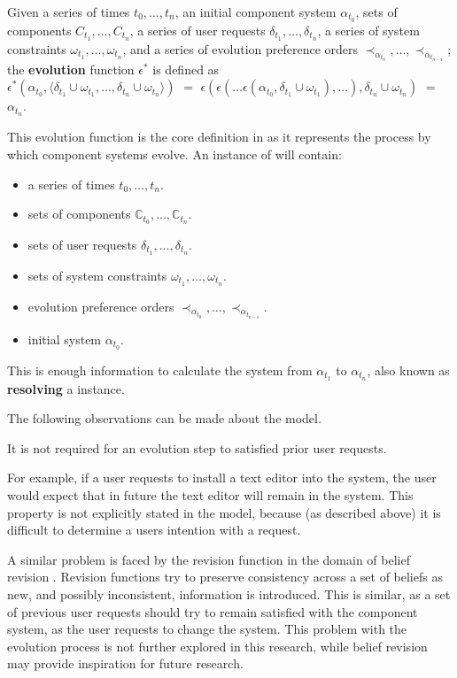 \begin{defs}
Given a series of times $t_0,\ldots,t_n$, an initial component system $\alpha_{t_0}$, 
sets of components $C_{t_1},\ldots,C_{t_n}$, a series of user requests $\delta_{t_1},\ldots,\delta_{t_n}$, a series of system constraints $\omega_{t_1},\ldots,\omega_{t_n}$,
and a series of evolution preference orders $\prec_{\alpha_{t_0}},\ldots, \prec_{\alpha_{t_{n-1}}}$;
the \textbf{evolution} function $\epsilon^*$ is defined as\\
$\epsilon^*(\alpha_{t_0},\langle \delta_{t_1} \cup \omega_{t_1},\ldots,\delta_{t_n} \cup \omega_{t_n} \rangle)$ $=$ $\epsilon(\epsilon(\ldots \epsilon(\alpha_{t_0},\delta_{t_1} \cup \omega_{t_1}),\ldots),\delta_{t_n} \cup \omega_{t_n})$
$=$ $\alpha_{t_n}$.
\end{defs}

This evolution function is the core definition in \modelname as it represents the process by which component systems evolve.
An instance of \modelname will contain: 
\begin{itemize}
  \item a series of times $t_0,\ldots,t_n$.
  \item sets of components $\mathbb{C}_{t_0},\ldots,\mathbb{C}_{t_n}$.
  \item sets of user requests $\delta_{t_1},\ldots,\delta_{t_n}$.
  \item sets of system constraints $\omega_{t_1},\ldots,\omega_{t_n}$.
  \item evolution preference orders $\prec_{\alpha_{t_0}},\ldots, \prec_{\alpha_{t_{n-1}}}$.
  \item initial system $\alpha_{t_0}$.
\end{itemize}
This is enough information to calculate the system from $\alpha_{t_1}$ to $\alpha_{t_n}$, also known as \textbf{resolving} a \modelname instance.

The following observations can be made about the \modelname model.

\begin{obs}
It is not required for an evolution step to satisfied prior user requests.
\end{obs}
For example, if a user requests to install a text editor into the system, 
the user would expect that in future the text editor will remain in the system.
This property is not explicitly stated in the model, because (as described above) it is difficult to determine a users intention with a request.

A similar problem is faced by the revision function in the domain of belief revision \citep{alchourron1985logic}.
Revision functions try to preserve consistency across a set of beliefs as new, and possibly inconsistent, information is introduced.
This is similar, as a set of previous user requests should try to remain satisfied with the component system, as the user requests to change the system.    
This problem with the evolution process is not further explored in this research, while belief revision may provide inspiration for future research.


